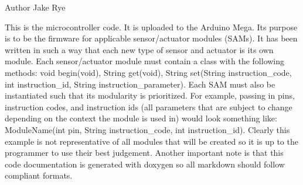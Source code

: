 \begin{DoxyAuthor}{Author}
Jake Rye
\end{DoxyAuthor}
This is the microcontroller code. It is uploaded to the Arduino Mega. It\textquotesingle{}s purpose is to be the firmware for applicable sensor/actuator modules (S\+A\+Ms). It has been written in such a way that each new type of sensor and actuator is its own module. Each sensor/actuator module must contain a class with the following methods\+: void begin(void), String get(void), String set(\+String instruction\+\_\+code, int instruction\+\_\+id, String instruction\+\_\+parameter). Each S\+A\+M must also be instantiated such that its modularity is prioritized. For example, passing in pins, instruction codes, and instruction ids (all parameters that are subject to change depending on the context the module is used in) would look something like\+: Module\+Name(int pin, String instruction\+\_\+code, int instruction\+\_\+id). Clearly this example is not representative of all modules that will be created so it is up to the programmer to use their best judgement. Another important note is that this code documentation is generated with doxygen so all markdown should follow compliant formats. 